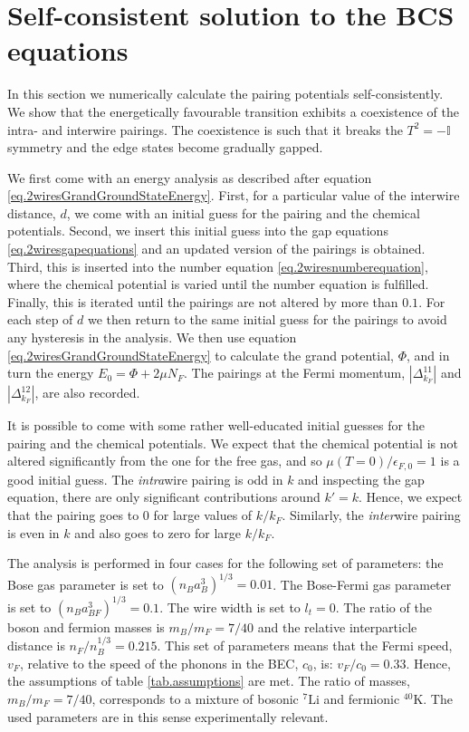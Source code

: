 \section{Self-consistent solution to the BCS equations}
\label{sec.2wiresCrossover_energy}
In this section we numerically calculate the pairing potentials self-consistently. We show that the energetically favourable transition exhibits a coexistence of the intra- and interwire pairings. The coexistence is such that it breaks the $T^2 = -\mathbb{I}$ symmetry and the edge states become gradually gapped. 

We first come with an energy analysis as described after equation \eqref{eq.2wiresGrandGroundStateEnergy}. First, for a particular value of the interwire distance, $d$, we come with an initial guess for the pairing and the chemical potentials. Second, we insert this initial guess into the gap equations \ref{eq.2wiresgapequations} and an updated version of the pairings is obtained. Third, this is inserted into the number equation \ref{eq.2wiresnumberequation}, where the chemical potential is varied until the number equation is fulfilled. Finally, this is iterated until the pairings are not altered by more than $0.1$\textperthousand. For each step of $d$ we then return to the same initial guess for the pairings to avoid any hysteresis in the analysis. We then use equation \eqref{eq.2wiresGrandGroundStateEnergy} to calculate the grand potential, $\Phi$, and in turn the energy $E_0 = \Phi + 2\mu N_F$. The pairings at the Fermi momentum, $|\Delta^{11}_{k_F}|$ and $|\Delta^{12}_{k_F}|$, are also recorded. 

It is possible to come with some rather well-educated initial guesses for the pairing and the chemical potentials. We expect that the chemical potential is not altered significantly from the one for the free gas, and so $\mu(T = 0)/\epsilon_{F,0} = 1$ is a good initial guess. The \textit{intra}wire pairing is odd in $k$ and inspecting the gap equation, there are only significant contributions around $k' = k$. Hence, we expect that the pairing goes to 0 for large values of $k/k_F$. Similarly, the \textit{inter}wire pairing is even in $k$ and also goes to zero for large $k / k_F$. 

The analysis is performed in four cases for the following set of parameters: the Bose gas parameter is set to $(n_Ba_B^3)^{1/3} = 0.01$. The Bose-Fermi gas parameter is set to $(n_Ba_{BF}^3)^{1/3} = 0.1$. The wire width is set to $l_t = 0$. The ratio of the boson and fermion masses is $m_B / m_F = 7/40$ and the relative interparticle distance is $n_F / n_B^{1/3} = 0.215$. This set of parameters means that the Fermi speed, $v_F$, relative to the speed of the phonons in the BEC, $c_0$, is: $v_F/c_0 = 0.33$. Hence, the assumptions of table \ref{tab.assumptions} are met. The ratio of masses, $m_B / m_F = 7 / 40$, corresponds to a mixture of bosonic $^{7}\text{Li}$ and fermionic $^{40}\text{K}$. The used parameters are in this sense experimentally relevant.   

